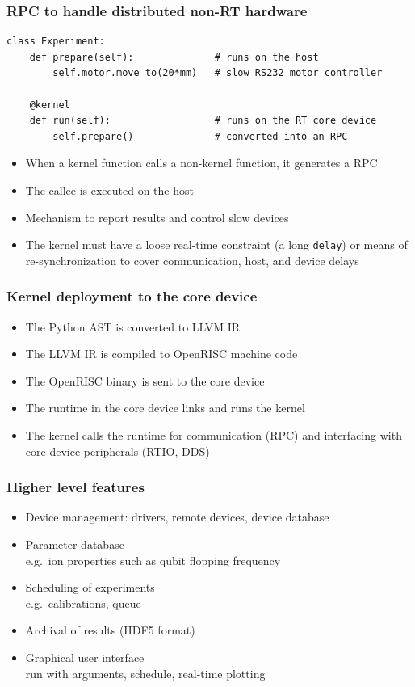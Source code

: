 \documentclass[final,presentation,compress]{beamer}
\begin{document}
\begin{frame}[fragile]
  \frametitle{RPC to handle distributed non-RT hardware}
  \footnotesize

  \begin{verbatim}
class Experiment:
    def prepare(self):              # runs on the host
        self.motor.move_to(20*mm)   # slow RS232 motor controller

    @kernel
    def run(self):                  # runs on the RT core device
        self.prepare()              # converted into an RPC
  \end{verbatim}

  \begin{itemize}
    \item When a kernel function calls a non-kernel function, it generates a RPC
    \item The callee is executed on the host
    \item Mechanism to report results and control slow devices
    \item The kernel must have a loose real-time constraint (a long \verb!delay!)
        or means of re-synchronization to cover communication, host, and device delays
  \end{itemize}
\end{frame}


\begin{frame}
  \frametitle{Kernel deployment to the core device}
  \footnotesize
  \begin{itemize}
    \item The Python AST is converted to LLVM IR
    \item The LLVM IR is compiled to OpenRISC machine code
    \item The OpenRISC binary is sent to the core device
    \item The runtime in the core device links and runs the kernel
    \item The kernel calls the runtime for communication (RPC) and interfacing
      with core device peripherals (RTIO, DDS)
  \end{itemize}
\end{frame}


\begin{frame}
  \frametitle{Higher level features}
  \footnotesize
  \begin{itemize}
  \item Device management: drivers, remote devices, device database
  \item Parameter database \\
       e.g.\ ion properties such as qubit flopping frequency
  \item Scheduling of experiments \\
      e.g.\ calibrations, queue
  \item Archival of results (HDF5 format)
  \item Graphical user interface \\
  	run with arguments, schedule, real-time plotting
  \end{itemize}
\end{frame}
\end{document}
